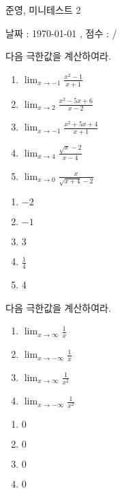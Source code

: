 \documentclass[a4paper]{oblivoir}
\begin{document}
\begin{center}
\LARGE 준영, 미니테스트 2
\end{center}
\begin{center}
날짜 : \today
,\qquad
점수 :  / 
\end{center}

%
\begin{Exercise}
다음 극한값을 계산하여라.
\begin{enumerate}[(1)]
\item
\(\displaystyle\lim_{x\to-1}\frac{x^2-1}{x+1}\)
\item
\(\displaystyle\lim_{x\to2}\frac{x^2-5x+6}{x-2}\)
\item
\(\displaystyle\lim_{x\to-1}\frac{x^2+5x+4}{x+1}\)
\item
\(\displaystyle\lim_{x\to4}\frac{\sqrt x-2}{x-4}\)
\item
\(\displaystyle\lim_{x\to0}\frac x{\sqrt{x+4}-2}\)
\end{enumerate}
\end{Exercise}

\begin{Answer}
\begin{enumerate}[(1)]
\item
\(-2\)
\item
\(-1\)
\item
\(3\)
\item
\(\frac14\)
\item
4
\end{enumerate}
\end{Answer}

%
\begin{Exercise}
다음 극한값을 계산하여라.
\begin{enumerate}[(1)]
\item
\(\displaystyle\lim_{x\to\infty}\frac1x\)
\item
\(\displaystyle\lim_{x\to-\infty}\frac1x\)
\item
\(\displaystyle\lim_{x\to\infty}\frac1{x^2}\)
\item
\(\displaystyle\lim_{x\to-\infty}\frac1{x^2}\)
\end{enumerate}
\end{Exercise}

\begin{Answer}
\begin{enumerate}[(1)]
\item
\(0\)
\item
\(0\)
\item
\(0\)
\item
\(0\)
\end{enumerate}
\end{Answer}
\end{document}
